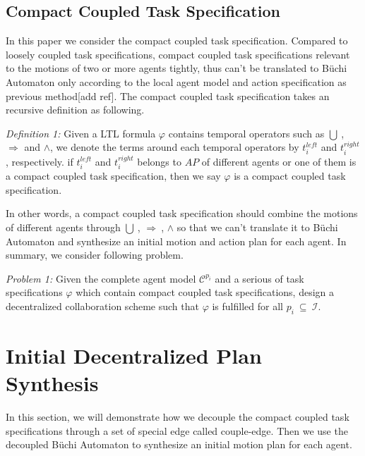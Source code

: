 \documentclass[journal]{IEEEtran}
\begin{document}
\subsection{Compact Coupled Task Specification}
In this paper we consider the compact coupled task specification. Compared to loosely coupled task specifications, compact coupled task specifications relevant to the motions of two or more agents tightly, thus can't be translated to B\"{u}chi Automaton only according to the local agent model and action specification as previous method[add ref]. The compact coupled task specification takes an recursive definition as following.
\par
\emph{Definition 1:} Given a LTL formula $\varphi$ contains temporal operators such as $\bigcup \ $, $\Longrightarrow$ and  $\wedge$, we denote the terms around each temporal operators by $t^{left}_i$ and $t^{right}_i$, respectively. if $t^{left}_i$ and $t^{right}_i$ belongs to $AP$ of different agents or one of them is a compact coupled task specification, then we say $\varphi$ is a compact coupled task specification.
\par
In other words, a compact coupled task specification should combine the motions of different agents through $\bigcup \ $, $\Longrightarrow \ $, $\wedge$ so that we can't translate it to B\"{u}chi Automaton and synthesize an initial motion and action plan for each agent. In summary, we consider following problem.
\par
\emph{Problem 1:}  Given the complete agent model $\mathcal{C}^{p_i}$ and a serious of task specifications $\varphi$ which contain compact coupled task specifications, design a decentralized collaboration scheme such that $\varphi$ is fulfilled for all $p_i \ \subseteq \ \mathcal{I}$.
\section{Initial Decentralized Plan Synthesis}
In this section, we will demonstrate how we decouple the compact coupled task specifications through a set of special edge called couple-edge. Then we use the decoupled B\"{u}chi Automaton to synthesize an initial motion plan for each agent.
\end{document}
